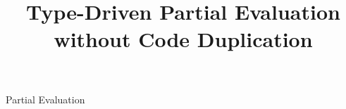 \documentclass{llncs}
\begin{document}
\title{Type-Driven Partial Evaluation without Code Duplication}

\maketitle

\begin{abstract}

\cite{scala_macros}
\end{abstract}

\keywords
Partial Evaluation












\end{document}
